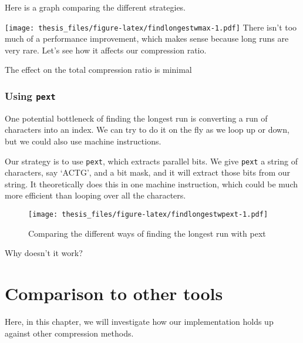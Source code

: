 \documentclass[12pt,twoside]{reedthesis}
\begin{document}
Here is a graph comparing the different strategies.

\texttt{[image: thesis\_files/figure-latex/findlongestwmax-1.pdf]}
There isn't too much of a performance improvement, which makes sense because long runs are very rare. Let's see how it affects our compression ratio.
\begin{table}[H]

\caption{\label{tab:maxenforcedstats}Compression Ratio change from disallowing long strings}
\centering
{}
\end{table}
The effect on the total compression ratio is minimal

\hypertarget{using-pext}{%
\subsection{\texorpdfstring{Using \texttt{pext}}{Using pext}}\label{using-pext}}

One potential bottleneck of finding the longest run is converting a run of characters into an index. We can try to do it on the fly as we loop up or down, but we could also use machine instructions.

Our strategy is to use \texttt{pext}, which extracts parallel bits. We give \texttt{pext} a string of characters, say `ACTG', and a bit mask, and it will extract those bits from our string. It theoretically does this in one machine instruction, which could be much more efficient than looping over all the characters.
\begin{figure}
\centering
\texttt{[image: thesis\_files/figure-latex/findlongestwpext-1.pdf]}
\caption{\label{fig:findlongestwpext}Comparing the different ways of finding the longest run with pext}
\end{figure}
Why doesn't it work?

\hypertarget{comparison-to-other-tools}{%
\chapter{Comparison to other tools}\label{comparison-to-other-tools}}

Here, in this chapter, we will investigate how our implementation holds up against other compression methods.
\end{document}
